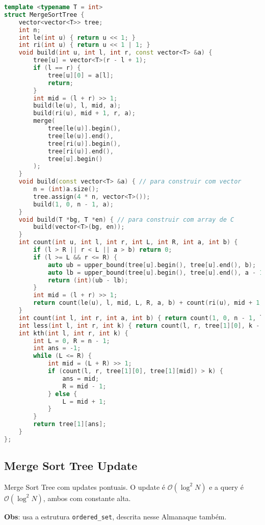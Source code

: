 \documentclass[10pt, a4paper, oneside]{book}
\begin{document}
\begin{lstlisting}[language=C++]
template <typename T = int>
struct MergeSortTree {
    vector<vector<T>> tree;
    int n;
    int le(int u) { return u << 1; }
    int ri(int u) { return u << 1 | 1; }
    void build(int u, int l, int r, const vector<T> &a) {
        tree[u] = vector<T>(r - l + 1);
        if (l == r) {
            tree[u][0] = a[l];
            return;
        }
        int mid = (l + r) >> 1;
        build(le(u), l, mid, a);
        build(ri(u), mid + 1, r, a);
        merge(
            tree[le(u)].begin(),
            tree[le(u)].end(),
            tree[ri(u)].begin(),
            tree[ri(u)].end(),
            tree[u].begin()
        );
    }
    void build(const vector<T> &a) { // para construir com vector
        n = (int)a.size();
        tree.assign(4 * n, vector<T>());
        build(1, 0, n - 1, a);
    }
    void build(T *bg, T *en) { // para construir com array de C
        build(vector<T>(bg, en));
    }
    int count(int u, int l, int r, int L, int R, int a, int b) {
        if (l > R || r < L || a > b) return 0;
        if (l >= L && r <= R) {
            auto ub = upper_bound(tree[u].begin(), tree[u].end(), b);
            auto lb = upper_bound(tree[u].begin(), tree[u].end(), a - 1);
            return (int)(ub - lb);
        }
        int mid = (l + r) >> 1;
        return count(le(u), l, mid, L, R, a, b) + count(ri(u), mid + 1, r, L, R, a, b);
    }
    int count(int l, int r, int a, int b) { return count(1, 0, n - 1, l, r, a, b); }
    int less(int l, int r, int k) { return count(l, r, tree[1][0], k - 1); }
    int kth(int l, int r, int k) {
        int L = 0, R = n - 1;
        int ans = -1;
        while (L <= R) {
            int mid = (L + R) >> 1;
            if (count(l, r, tree[1][0], tree[1][mid]) > k) {
                ans = mid;
                R = mid - 1;
            } else {
                L = mid + 1;
            }
        }
        return tree[1][ans];
    }
};
\end{lstlisting}
\hfill

\subsection{Merge Sort Tree Update}


Merge Sort Tree com updates pontuais. O update é $\mathcal{O}(\log^2 N)$ e a query é $\mathcal{O}(\log^2 N)$, ambos com constante alta.



\textbf{Obs}: usa a estrutura \texttt{ordered\_set}, descrita nesse Almanaque também.
\hfill
\end{document}
